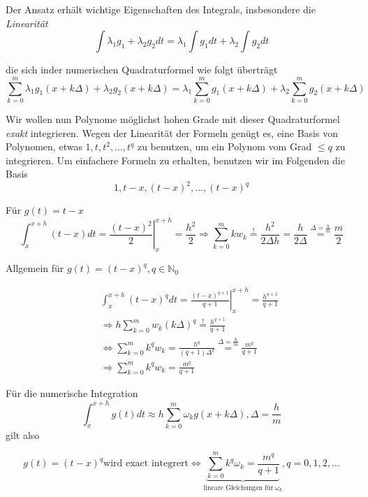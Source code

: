 \documentclass[10pt,a4paper]{article}
\begin{document}
Der Ansatz erhält wichtige Eigenschaften des Integrals, insbesondere die \emph{Linearität} $$\int\lambda_1g_1+\lambda_2 g_2 dt = \lambda_1 \int g_1 dt + \lambda_2 \int g_2 dt$$

die sich inder numerischen Quadraturformel wie folgt überträgt $$\sum^{m}_{k=0} \lambda_1 g_1(x+k\Delta) + \lambda_2 g_2(x+k\Delta) = \lambda_1 \sum^{m}_{k=0}  g_1(x+k\Delta) + \lambda_2 \sum^{m}_{k=0}  g_2(x+k\Delta) $$



Wir wollen nun Polynome möglichst hohen Grade mit dieser Quadraturformel \emph{exakt} integrieren. Wegen der Linearität der Formeln genügt es, eine Basis von Polynomen, etwas $1,t,t^{2},...,t^{q}$ zu benutzen, um ein Polynom vom Grad $\leq q$ zu integrieren. Um einfachere Formeln zu erhalten, benutzen wir im Folgenden die Basis $$1,t-x, (t-x)^{2},..., (t-x)^{q}$$



Für $g(t)=t-x$ $$\int^{x+h}_{x} (t-x) dt=\left. \frac{(t-x)^{2}}{2} \right|^{x+h}_x = \frac{h^{2}}{2} \Rightarrow \sum^{m}_{k=0} k w_k \stackrel{!}{=} \frac{h^{2}}{2\Delta h} = \frac{h}{2\Delta} \stackrel{\Delta = \frac{h}{m}}{=}  \frac{m}{2}$$


Allgemein für $g(t)=(t-x)^{q}, q \in \mathbb{N}_{0}$

\begin{eqnarray*}
&&\int^{x+h}_{x} (t-x)^{q} dt = \left. \frac{(t-x)^{q+1}}{q+1} \right|^{x+h}_x = \frac{h^{q+1}}{q+1} \\
&&\Rightarrow h \sum^{m}_{k=0} w_k (k\Delta)^{q} \stackrel{!}{=} \frac{h^{q+1}}{q+1} \\ 
&&\Leftrightarrow \sum^{m}_{k=0} k^{q} w_k = \frac{h^{q}}{(q+1)\Delta^{q}}\stackrel{ \Delta=\frac{h}{m}}{=}\frac{m^{q}}{q+1} \\
&& \Rightarrow  \sum^{m}_{k=0}k^{q} w_k = \frac{m^{q}}{q+1}
\end{eqnarray*}









Für die numerische Integration $$\int_{x}^{x+h} g(t) dt \approx h \sum_{k=0}^{m} \omega_k g(x+k\Delta), \Delta=\frac{h}{m}$$ gilt also

$$ g(t)=(t-x)^{q} \text{wird exact integrert} \Leftrightarrow \underbrace{\sum_{k=0}^{m}k^{q}\omega_k=\frac{m^{q}}{q+1}}_{ \text{lineare Gleichungen für} ~ \omega_k}, q=0,1,2,\ldots$$
\end{document}
